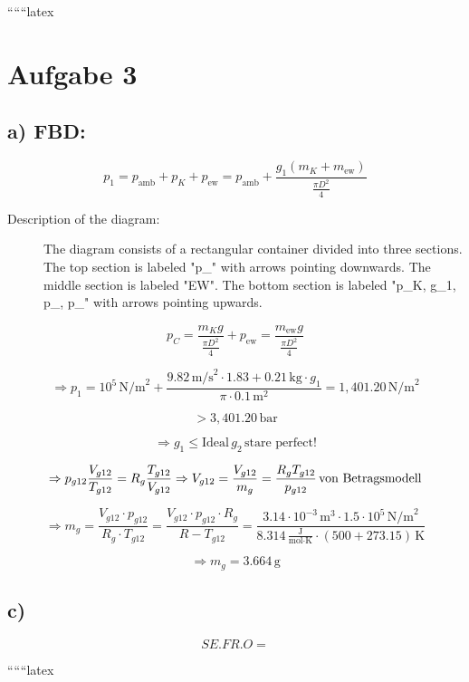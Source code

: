 
``````latex


\section*{Aufgabe 3}

\subsection*{a) FBD:}

\[
p_1 = p_{\text{amb}} + p_K + p_{\text{ew}} = p_{\text{amb}} + \frac{g_1 (m_K + m_{\text{ew}})}{\frac{\pi D^2}{4}}
\]

\begin{description}
    \item[Description of the diagram:]
    The diagram consists of a rectangular container divided into three sections. The top section is labeled "p_{}" with arrows pointing downwards. The middle section is labeled "EW". The bottom section is labeled "p_K, g_1, p_{}, p_{}" with arrows pointing upwards.
\end{description}

\[
p_C = \frac{m_K g}{\frac{\pi D^2}{4}} + p_{\text{ew}} = \frac{m_{\text{ew}} g}{\frac{\pi D^2}{4}}
\]

\[
\Rightarrow p_1 = 10^5 \, \text{N/m}^2 + \frac{9.82 \, \text{m/s}^2 \cdot 1.83 + 0.21 \, \text{kg} \cdot g_1}{\pi \cdot 0.1 \, \text{m}^2} = 1,401.20 \, \text{N/m}^2
\]

\[
> 3,401.20 \, \text{bar}
\]

\[
\Rightarrow g_1 \leq \text{Ideal} \, g_2 \, \text{stare perfect!}
\]

\[
\Rightarrow p_{g12} \frac{V_{g12}}{T_{g12}} = R_g \frac{T_{g12}}{V_{g12}} \Rightarrow V_{g12} = \frac{V_{g12}}{m_g} = \frac{R_g T_{g12}}{p_{g12}} \, \text{von \text{Betragsmodell}}
\]

\[
\Rightarrow m_g = \frac{V_{g12} \cdot p_{g12}}{R_g \cdot T_{g12}} = \frac{V_{g12} \cdot p_{g12} \cdot R_g}{R - T_{g12}} = \frac{3.14 \cdot 10^{-3} \, \text{m}^3 \cdot 1.5 \cdot 10^5 \, \text{N/m}^2}{8.314 \, \frac{\text{J}}{\text{mol} \cdot \text{K}} \cdot (500 + 273.15) \, \text{K}}
\]

\[
\Rightarrow m_g = 3.664 \, \text{g}
\]

\subsection*{c)}

\[
SE. FR. O = 
\]

``````latex


